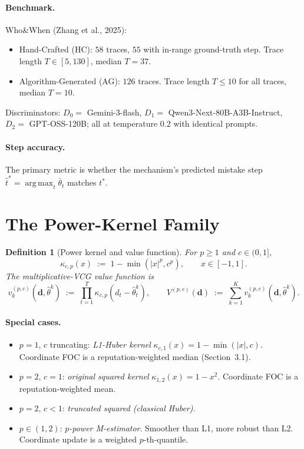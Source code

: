 \documentclass[11pt]{article}
\newtheorem{definition}[theorem]{Definition}
\DeclareMathOperator*{\argmax}{arg\,max}
\newcommand{\thetahat}{\hat{\theta}}
\newcommand{\db}{\bm{d}}
\begin{document}
\paragraph{Benchmark.} Who\&When (Zhang et al., 2025):
\begin{itemize}[nosep]
\item Hand-Crafted (HC): $58$ traces, $55$ with in-range ground-truth
step. Trace length $T \in [5, 130]$, median $T = 37$.
\item Algorithm-Generated (AG): $126$ traces. Trace length $T \leq 10$
for all traces, median $T = 10$.
\end{itemize}
Discriminators: $D_0 = $ Gemini-3-flash, $D_1 = $ Qwen3-Next-80B-A3B-Instruct,
$D_2 = $ GPT-OSS-120B; all at temperature $0.2$ with identical prompts.

\paragraph{Step accuracy.} The primary metric is whether the mechanism's
predicted mistake step $\hat t^* = \argmax_t \bar\theta_t$ matches $t^*$.

\section{The Power-Kernel Family}

\begin{definition}[Power kernel and value function]
For $p \geq 1$ and $c \in (0, 1]$,
\[
\kappa_{c, p}(x) \;:=\; 1 - \min(|x|^p, c^p), \qquad x \in [-1, 1].
\]
The multiplicative-VCG value function is
\[
v_k^{(p, c)}(\db, \thetahat^k) \;:=\; \prod_{t=1}^T \kappa_{c, p}(d_t - \thetahat^k_t),
\qquad
V^{(p, c)}(\db) \;:=\; \sum_{k=1}^K v_k^{(p, c)}(\db, \thetahat^k).
\]
\end{definition}

\paragraph{Special cases.}
\begin{itemize}[nosep, leftmargin=*]
\item $p = 1$, $c$ truncating: \emph{L1-Huber kernel} $\kappa_{c, 1}(x) = 1 - \min(|x|, c)$.
Coordinate FOC is a reputation-weighted median (Section~3.1).
\item $p = 2$, $c = 1$: \emph{original squared kernel} $\kappa_{1, 2}(x) = 1 - x^2$.
Coordinate FOC is a reputation-weighted mean.
\item $p = 2$, $c < 1$: \emph{truncated squared (classical Huber)}.
\item $p \in (1, 2)$: \emph{$p$-power M-estimator}. Smoother than L1, more
robust than L2. Coordinate update is a weighted $p$-th-quantile.
\end{itemize}
\end{document}

